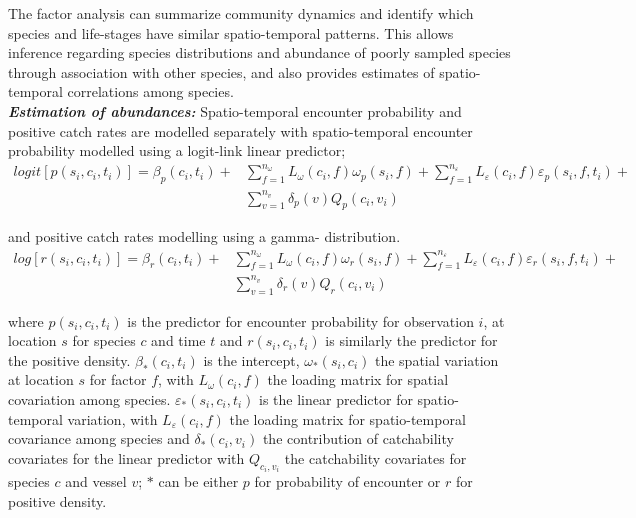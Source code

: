 \documentclass[fleqn,10pt]{wlscirep}
\begin{document}
\begin{linenumbers}
The factor analysis can summarize community dynamics and identify which species
and life-stages have similar spatio-temporal patterns. This allows inference
regarding species distributions and abundance of poorly sampled species through
association with other species, and also provides estimates of spatio-temporal
correlations among species\cite{Thorson2016b}.\\

\textbf{\textit{Estimation of abundances:}} Spatio-temporal encounter
probability and positive catch rates are modelled separately with
spatio-temporal encounter probability modelled using a logit-link linear
predictor;
		\begin{equation}
			\begin{split}
			logit[p(s_{i},c_{i},t_{i})] =	\beta_{p}(c_{i},t_{i}) +
			& \sum\limits_{f=1}^{n_{\omega}} L_{\omega}(c_{i},f)
			\omega_{p}(s_{i},f) + \sum\limits_{f=1}^{n_{\varepsilon}}
			L_{\varepsilon}(c_{i},f) \varepsilon_{p}(s_{i},f,t_{i}) + \\ 
			& \sum\limits_{v=1}^{n_{v}}\delta_{p}(v)Q_{p}(c_{i}, v_{i})
		\end{split}
		\end{equation}

and positive catch rates modelling using a gamma- distribution\cite{Thorson2015a}. 
		\begin{equation}
			\begin{split}
			log[r(s_{i},c_{i},t_{i})] = \beta_{r}(c_{i},t_{i}) +
			& \sum\limits_{f=1}^{n_{\omega}} L_{\omega}(c_{i},f)
			\omega_{r}(s_{i},f) +\sum\limits_{f=1}^{n_{\varepsilon}} 
			L_{\varepsilon}(c_{i},f) \varepsilon_{r}(s_{i},f,t_{i}) + \\
			& \sum\limits_{v=1}^{n_{v}}\delta_{r}(v) Q_{r}(c_{i}, v_{i})
			\end{split}
		\end{equation}

where $p(s_{i}, c_{i}, t_{i})$ is the predictor for encounter probability for
observation $i$, at location $s$ for species $c$ and time $t$ and
$r(s_{i}, c_{i}, t_{i})$ is similarly the predictor for the positive density.
$\beta_{*}(c_{i},t_{i})$ is the intercept, $\omega_{*}(s_{i},c_{i})$ the
spatial variation at location $s$ for factor $f$, with $L_{\omega}(c_{i},f)$
the loading matrix for spatial covariation among species.
$\varepsilon_{*}(s_{i},c_{i},t_{i})$ is the linear predictor for
spatio-temporal variation, with $L_{\varepsilon}(c_{i}, f)$ the loading matrix
for spatio-temporal covariance among species and $\delta_{*}(c_{i},
v_{i})$ the contribution of catchability covariates for the linear predictor
with $Q_{c_{i}, v_{i}}$ the catchability covariates for species $c$ and
vessel $v$;  $*$ can be either $p$ for probability of encounter or $r$ for
positive density.\\


\end{linenumbers}
\end{document}
